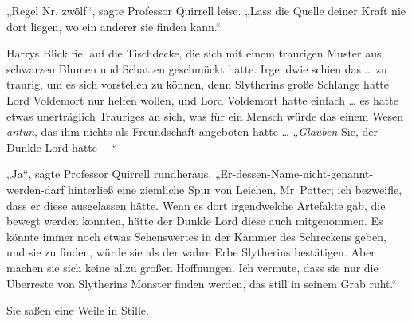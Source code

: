 „Regel Nr. zwölf“, sagte Professor Quirrell leise.
„Lass die Quelle deiner Kraft nie dort liegen, wo ein anderer sie finden kann.“

Harrys Blick fiel auf die Tischdecke, die sich mit einem traurigen Muster aus schwarzen Blumen und Schatten geschmückt hatte. Irgendwie schien das … zu traurig, um es sich vorstellen zu können, denn Slytherins große Schlange hatte Lord Voldemort nur helfen wollen, und Lord Voldemort hatte einfach … es hatte etwas unerträglich Trauriges an sich, was für ein Mensch würde das einem Wesen \emph{antun}, das ihm nichts als Freundschaft angeboten hatte …
„\emph{Glauben} Sie, der Dunkle Lord hätte —“

„Ja“, sagte Professor Quirrell rundheraus.
„Er-dessen-Name-nicht-genannt-werden-darf hinterließ eine ziemliche Spur von Leichen, Mr~Potter; ich bezweifle, dass er diese ausgelassen hätte. Wenn es dort irgendwelche Artefakte gab, die bewegt werden konnten, hätte der Dunkle Lord diese auch mitgenommen. Es könnte immer noch etwas Sehenswertes in der Kammer des Schreckens geben, und sie zu finden, würde sie als der wahre Erbe Slytherins bestätigen. Aber machen sie sich keine allzu großen Hoffnungen. Ich vermute, dass sie nur die Überreste von Slytherins Monster finden werden, das still in seinem Grab ruht.“

Sie saßen eine Weile in Stille.

